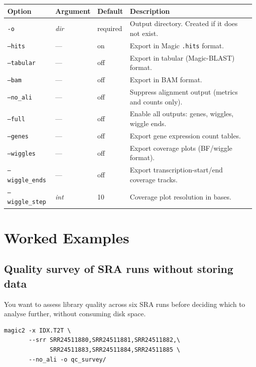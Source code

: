 \documentclass[11pt]{article}
\newcommand{\code}[1]{\texttt{#1}}
\begin{document}
\begin{center}
\begin{longtable}{p{4cm} p{2.2cm} p{2cm} p{6cm}}
\toprule
\textbf{Option} & \textbf{Argument} & \textbf{Default} & \textbf{Description} \\
\midrule
\endhead
\code{-o}             & \textit{dir}  & required & Output directory.  Created if it does not exist. \\
\code{--hits}         & ---           & on       & Export in Magic \code{.hits} format. \\
\code{--tabular}      & ---           & off      & Export in tabular (Magic-BLAST) format. \\
\code{--bam}          & ---           & off      & Export in BAM format. \\
\code{--no\_ali}      & ---           & off      & Suppress alignment output (metrics and counts only). \\
\code{--full}         & ---           & off      & Enable all outputs: genes, wiggles, wiggle ends. \\
\code{--genes}        & ---           & off      & Export gene expression count tables. \\
\code{--wiggles}      & ---           & off      & Export coverage plots (BF/wiggle format). \\
\code{--wiggle\_ends} & ---           & off      & Export transcription-start/end coverage tracks. \\
\code{--wiggle\_step} & \textit{int}  & 10       & Coverage plot resolution in bases. \\
\bottomrule
\end{longtable}
\end{center}

\section{Worked Examples}

\subsection{Quality survey of SRA runs without storing data}

You want to assess library quality across six SRA runs before deciding
which to analyse further, without consuming disk space.

\begin{lstlisting}
magic2 -x IDX.T2T \
       --srr SRR24511880,SRR24511881,SRR24511882,\
             SRR24511883,SRR24511884,SRR24511885 \
       --no_ali -o qc_survey/
\end{lstlisting}
\end{document}
